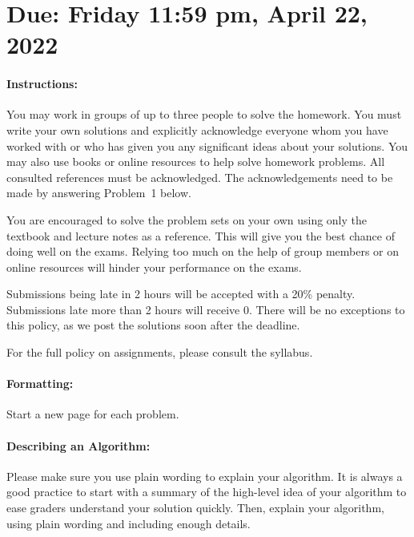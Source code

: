 \documentclass[11pt]{article}
\begin{document}
\maketitle

\section*{Due: Friday 11:59 pm, April 22, 2022}

\paragraph*{Instructions:}

You may work in groups of up to three people to solve the homework.
You must write your own solutions and explicitly acknowledge everyone whom 
you have worked with or who has given you any significant ideas about your solutions. 
You may also use books or online resources to help solve homework problems.  
All consulted references must be acknowledged. The acknowledgements need to be made by answering Problem~1 below.

You are encouraged to solve the problem sets on your own using only the textbook and lecture notes as a reference. This will give you the best chance of doing well on the exams. Relying too much on the help of group members or on online resources will hinder your performance on the exams.

Submissions being late in 2 hours will be accepted with a 20\% penalty. Submissions late more than 2 hours will receive 0. There will be no exceptions to this policy, as we post the solutions soon after the deadline. 

For the full policy on assignments, please consult the syllabus.

\paragraph*{Formatting:} Start a new page for each problem.

\paragraph*{Describing an Algorithm:} Please make sure you use plain wording to explain your algorithm. It is always a good practice to start with a summary of the high-level idea of your algorithm to ease graders understand your solution quickly. Then, explain your algorithm, using plain wording and including enough details.
\end{document}
